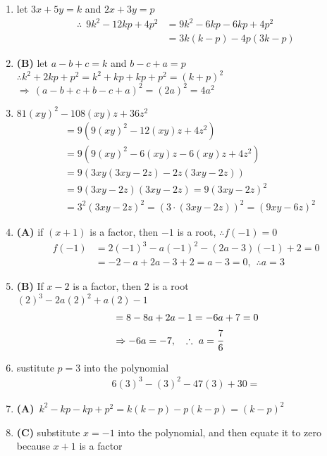 \begin{multicols}{2}
\begin{enumerate}[label={\textbf{\arabic*.}}]
\item let $3x + 5y = k$ and $2x + 3y = p$ 
\begin{align*}
\therefore \hspace{5pt} 9k^2 -12kp + 4p^2 &= 9k^2 -6kp -6kp + 4p^2  \\
&= 3k(k-p)-4p(3k-p)
\end{align*}
\item \textbf{(B)} let $a - b + c = k $ and $b-c +a = p$ \\
$\therefore k^2 + 2kp + p^2 = k^2 + kp + kp +p^2 = (k + p)^2$ \\
$\Rightarrow \, (a - b + c  + b -c +a )^2 = (2a)^2 = 4a^2$
\item $81(xy)^2 - 108(xy)z + 36z^2$ 
\begin{align*}
&= 9\left(9(xy)^2 - 12(xy)z + 4z^2\right) \\
&= 9\left(9(xy)^2 - 6(xy)z - 6(xy)z + 4z^2\right) \\
&= 9\left(3xy(3xy - 2z) - 2z(3xy - 2z)\right) \\
&= 9\left(3xy - 2z\right)\left(3xy - 2z\right) = 9(3xy -2z)^2 \\
& = 3^2(3xy -2z)^2 = (3 \cdot (3xy -2z))^2 = (9xy -6z)^2
\end{align*}
\item \textbf{(A)} if $(x+1)$ is a factor, then  $-1$ is a root, $\therefore  f(-1) = 0$ 
\begin{align*}
    f(-1) &= 2(-1)^3 -a(-1)^2 -(2a-3)(-1) + 2 = 0 \\
    & = -2 -a + 2a -3 + 2 = a -3 =0 , \hspace{5pt} \therefore a = 3
\end{align*}
\item \textbf{(B)} If $x-2$ is a factor, then $2$ is a root\\
$(2)^3 -2a(2)^2 + a(2) - 1$ \vspace{-10pt}
\begin{align*} 
     &= 8 - 8a + 2a - 1 = -6a + 7 = 0 \\
     & \Rightarrow -6a = -7, \hspace{10pt} \therefore \,\, a = \cfrac{7}{6}
\end{align*}
\item sustitute $p = 3$ into the polynomial 
    \begin{align*} 
        6(3)^3 -(3)^2 -47(3) + 30 = 
    \end{align*}
\item \textbf{(A)} $ \, k^2 -kp -kp + p^2 = k(k-p) -p(k-p) = (k-p)^2$
\item \textbf{(C)} substitute $x=-1$ into the polynomial, and then equate it to zero because $x+1$ is a factor \\

\end{enumerate}
\end{multicols}

